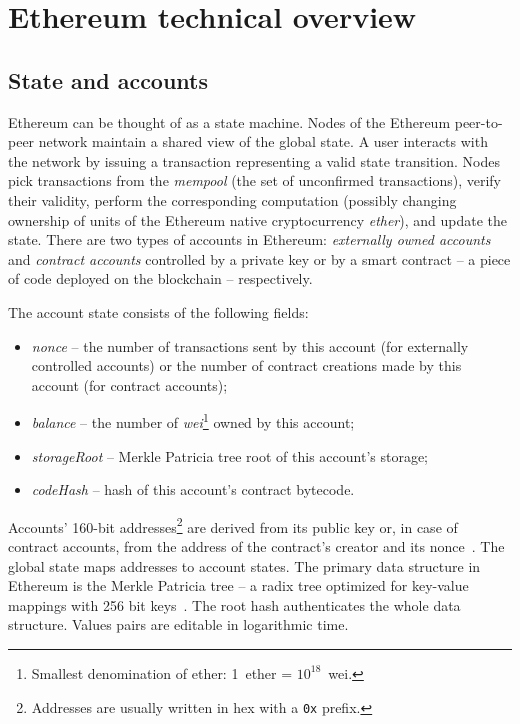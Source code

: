 \section{Ethereum technical overview}

\subsection{State and accounts}
Ethereum can be thought of as a state machine.
Nodes of the Ethereum peer-to-peer network maintain a shared view of the global state.
A user interacts with the network by issuing a transaction representing a valid state transition.
Nodes pick transactions from the \emph{mempool} (the set of unconfirmed transactions), verify their validity, perform the corresponding computation (possibly changing ownership of units of the Ethereum native cryptocurrency \emph{ether}), and update the state.
There are two types of accounts in Ethereum: \emph{externally owned accounts} and \emph{contract accounts} controlled by a private key or by a smart contract -- a piece of code deployed on the blockchain -- respectively.

The account state consists of the following fields:
\begin{itemize}
	\item \emph{nonce} -- the number of transactions sent by this account (for externally controlled accounts) or the number of contract creations made by this account (for contract accounts);
	\item \emph{balance} -- the number of \emph{wei}\footnote{Smallest denomination of ether: 1~ether = $10^{18}$~wei.} owned by this account;
	\item \emph{storageRoot} -- Merkle Patricia tree root of this account's storage;
	\item \emph{codeHash} -- hash of this account's contract bytecode.
\end{itemize}

Accounts' 160-bit addresses\footnote{Addresses are usually written in hex with a \texttt{0x} prefix.} are derived from its public key or, in case of contract accounts, from the address of the contract's creator and its nonce~\cite{EthereumSE16}.
The global state maps addresses to account states.
The primary data structure in Ethereum is the Merkle Patricia tree -- a radix tree optimized for key-value mappings with 256 bit keys~\cite{MPTSpec, Buchman14}.
The root hash authenticates the whole data structure.
Values pairs are editable in logarithmic time.

